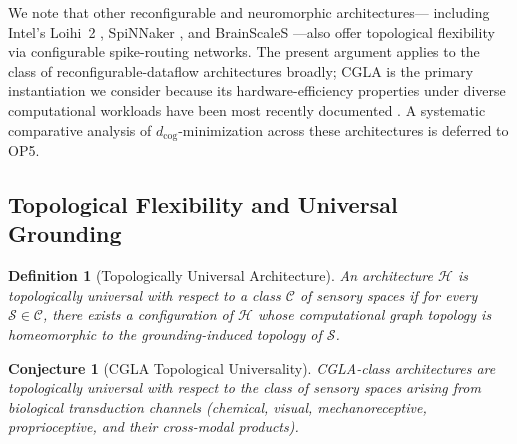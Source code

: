 \documentclass[12pt]{article}
\newtheorem{definition}{Definition}
\newtheorem{conjecture}{Conjecture}
\begin{document}
We note that other reconfigurable and neuromorphic architectures---
including Intel's Loihi~2 \cite{davies2021}, SpiNNaker
\cite{furber2014}, and BrainScaleS \cite{schemmel2010}---also offer
topological flexibility via configurable spike-routing networks. The
present argument applies to the class of reconfigurable-dataflow
architectures broadly; CGLA is the primary instantiation we consider
because its hardware-efficiency properties under diverse computational
workloads have been most recently documented \cite{akabe2025,
ando2025_whisper}. A systematic comparative analysis of
$d_{\mathrm{cog}}$-minimization across these architectures is
deferred to OP5.

\subsection{Topological Flexibility and Universal Grounding}

\begin{definition}[Topologically Universal Architecture]
An architecture $\mathcal{H}$ is \emph{topologically universal} with
respect to a class $\mathcal{C}$ of sensory spaces if for every
$\mathcal{S} \in \mathcal{C}$, there exists a configuration of
$\mathcal{H}$ whose computational graph topology is homeomorphic to the
grounding-induced topology of $\mathcal{S}$.
\end{definition}

\begin{conjecture}[CGLA Topological Universality]
CGLA-class architectures are topologically universal with respect to the
class of sensory spaces arising from biological transduction channels
(chemical, visual, mechanoreceptive, proprioceptive, and their
cross-modal products).
\end{conjecture}
\end{document}
